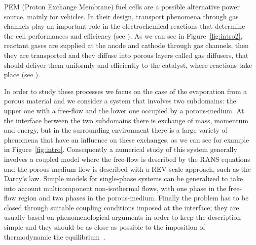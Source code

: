 PEM (Proton Exchange Membrane) fuel cells are a possible alternative power source, mainly for vehicles. In their design, transport phenomena through gas channels play an important role in the electrochemical reactions that determine the cell performances and efficiency (see \cite{wu:fuelcell}). As we can see in Figure~\ref{fig:intro2}, reactant gases are supplied at the anode and cathode through gas channels, then they are transported and they diffuse into porous layers called gas diffusers, that should deliver them uniformly and efficiently to the catalyst, where reactions take place (see \cite{tesi:pem}).

In order to study these processes we focus on the case of the evaporation from 
a porous material and we consider a system that involves two subdomains: the 
upper 
one with a free-flow and the lower one occupied by a porous-medium. At the 
interface between the two subdomains there is exchange of mass, momentum and 
energy, but in the surrounding environment there is a large variety of 
phenomena that have an influence on these exchanges, as we can see for example 
in Figure~\ref{fig:intro}.
%
Consequently a numerical study of this system generally involves a coupled 
model where the free-flow is described by the RANS equations and the 
porous-medium flow is described with a REV-scale approach, such as the Darcy's 
law. 
Simple models for single-phase systems can be generalized to take 
into account multicomponent non-isothermal flows, with one phase in the 
free-flow region and two phases in the porous-medium. Finally the problem 
has to be closed through suitable coupling conditions imposed at the 
interface; they are usually based on phenomenological arguments in order to 
keep the description simple and they should be as close as possible to the 
imposition of thermodynamic the equilibrium~\cite{paper:mosthaf}.

